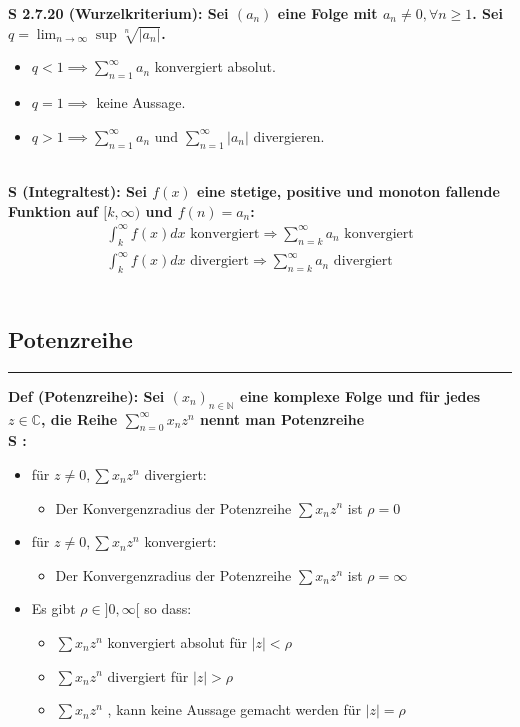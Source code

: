 \documentclass[7pt,landscape, margin = 0.1mm]{article}
\def\limn{\lim_{n\to \infty}}
\newcommand*{\mysubsection}[1]{\vspace{-2mm}\color{chaptercolor}\subsection{ #1 }
\vspace{-1mm}\hrule\vspace{1.5mm}\color{black}
\vspace{2mm}}
\newcommand{\DEF}[2]{\color{chaptercolor}\bf{Def #1}:\color{black}    \hspace{0.2cm} #2 \\}
\newcommand{\SA}[2]{\color{chaptercolor}\bf{S #1}:\color{black}    \hspace{0.2cm} #2 \\}
\begin{document}
\begin{multicols}{4}
\begin{flushleft}
{\begin{itemize}
\end{itemize}
}
\SA{2.7.20 (Wurzelkriterium)}{Sei $(a_n)$ eine Folge mit $a_n \ne 0, \forall n \ge 1$. Sei $q = \limn \sup \sqrt[n]{|a_n|}$. 
\begin{itemize}
 \item $q < 1 \implies \sum_{n=1}^\infty a_n$ konvergiert absolut.
 \item $q = 1 \implies$ keine Aussage.
 \item $q > 1 \implies \sum_{n=1}^\infty a_n$ und $\sum_{n=1}^\infty |a_n|$ divergieren.
\end{itemize}}
\SA{(Integraltest)}{Sei $f(x)$ eine stetige, positive und monoton fallende
Funktion auf $[k, \infty)$ und $f(n) = a_n$:
\begin{align*}
\int_{k}^{\infty} f(x) dx \text{ konvergiert} \Rightarrow \sum_{n = k}^{\infty} a_n \text{ konvergiert}\\
\int_{k}^{\infty} f(x) dx \text{ divergiert}  \Rightarrow \sum_{n = k}^{\infty} a_n \text{ divergiert}
\end{align*}}
\mysubsection{Potenzreihe}
\DEF{(Potenzreihe)}{Sei $(x_n)_{n \in \mathbb{N}}$ eine komplexe Folge und für jedes $z \in \mathbb{C}$, die Reihe
$ \sum_{n=0}^{\infty} x_n z^n $
nennt man Potenzreihe}
\SA{}{ 
\begin{itemize}


\item für $z \neq 0, \sum x_nz^n$ divergiert:
\begin{itemize}
\item Der Konvergenzradius der Potenzreihe $\sum x_n z^n$ ist $\rho = 0$\end{itemize}
\item für $z \neq 0, \sum x_nz^n$ konvergiert:
\begin{itemize}
\item Der Konvergenzradius der Potenzreihe $\sum x_n z^n$ ist $\rho = \infty$
\end{itemize}
\item Es gibt $\rho \in ]0, \infty[$ so dass:
\begin{itemize}
\item  $\sum x_n z^n$ konvergiert absolut für $|z| < \rho$
\item  $\sum x_n z^n$ divergiert für $|z| > \rho$
\item $\sum x_n z^n$ , kann keine Aussage gemacht werden für $|z| = \rho$ 

\end{itemize}


\end{itemize}}
\end{flushleft}
\end{multicols}
\end{document}
